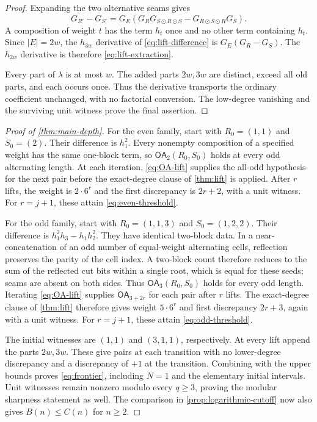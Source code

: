 \documentclass[11pt,a4paper]{amsart}
\numberwithin{equation}{section}
\theoremstyle{plain}
\theoremstyle{definition}
\newcommand{\OA}{\mathsf{OA}}
\begin{document}
\begin{proof}
Expanding the two alternative seams gives
\begin{equation}\label{eq:lift-difference}
G_{R'}-G_{S'}
=G_E\left(G_R G_{S\odot R\odot S}
-G_{R\odot S\odot R}G_S\right).
\end{equation}
A composition of weight \(t\) has the term \(h_t\) once and no other term
containing \(h_t\).  Since \(|E|=2w\), the \(h_{3w}\) derivative of
\eqref{eq:lift-difference} is \(G_E(G_R-G_S)\).  The \(h_{2w}\) derivative
is therefore \eqref{eq:lift-extraction}.

Every part of \(\lambda\) is at most \(w\).  The added parts \(2w,3w\) are
distinct, exceed all old parts, and each occurs once.  Thus the derivative
transports the ordinary coefficient unchanged, with no factorial
conversion.  The low-degree vanishing and the surviving unit witness
prove the final assertion.
\end{proof}

\begin{proof}[Proof of \cref{thm:main-depth}]
For the even family, start with \(R_0=(1,1)\) and \(S_0=(2)\).
Their difference is \(h_1^2\).  Every nonempty composition of a specified
weight has the same one-block term, so \(\OA_2(R_0,S_0)\) holds at every
odd alternating length.  At each iteration, \eqref{eq:OA-lift} supplies
the all-odd hypothesis for the next pair before the exact-degree clause
of \cref{thm:lift} is applied.  After \(r\) lifts, the weight is
\(2\cdot6^r\) and the first discrepancy is \(2r+2\), with a unit witness.
For \(r=j+1\), these attain \eqref{eq:even-threshold}.

For the odd family, start with \(R_0=(1,1,3)\) and \(S_0=(1,2,2)\).
Their difference is \(h_1^2h_3-h_1h_2^2\).
They have identical two-block data.  In a near-concatenation of an odd number of
equal-weight alternating cells, reflection preserves the parity of the
cell index.  A two-block count therefore reduces to the sum of the
reflected cut bits within a single root, which is equal for these seeds;
seams are absent on both sides.  Thus \(\OA_3(R_0,S_0)\) holds for every
odd length.  Iterating \eqref{eq:OA-lift} supplies \(\OA_{3+2r}\) for
each pair after \(r\) lifts.  The exact-degree clause of \cref{thm:lift}
therefore gives weight \(5\cdot6^r\) and first discrepancy \(2r+3\),
again with a unit witness.  For \(r=j+1\), these attain
\eqref{eq:odd-threshold}.

The initial witnesses are \((1,1)\) and \((3,1,1)\), respectively.  At every
lift append the parts \(2w,3w\).  These give pairs at each transition with
no lower-degree discrepancy and a discrepancy of \(+1\) at the transition.
Combining with the upper bounds proves \eqref{eq:frontier}, including
\(N=1\) and the elementary initial intervals.  Unit witnesses remain nonzero
modulo every \(q\ge3\), proving the modular sharpness statement as well.
The comparison in \cref{prop:logarithmic-cutoff} now also gives
\(B(n)\le C(n)\) for \(n\ge2\).
\end{proof}
\end{document}
